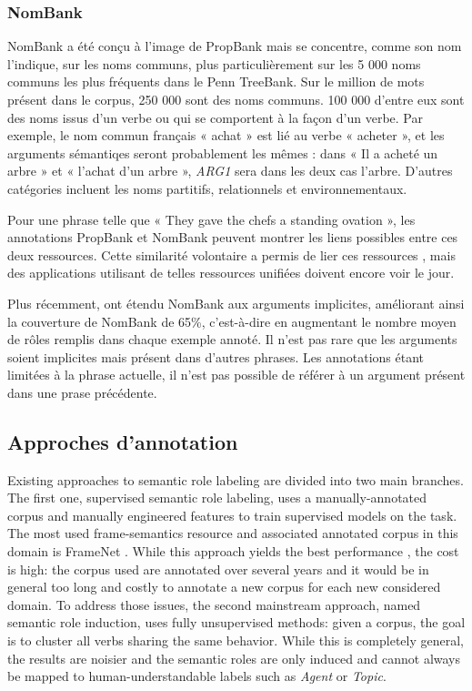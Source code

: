 \subsubsection{NomBank}

NomBank \citep{meyers2004nombank} a été conçu à l'image de PropBank mais se
concentre, comme son nom l'indique, sur les noms communs, plus particulièrement
sur les 5 000 noms communs les plus fréquents dans le Penn TreeBank. Sur le
million de mots présent dans le corpus, 250 000 sont des noms communs. 100 000
d'entre eux sont des noms issus d'un verbe ou qui se comportent à la façon d'un
verbe. Par exemple, le nom commun français « achat » est lié au verbe « acheter
», et les arguments sémantiqes seront probablement les mêmes : dans « Il a
acheté un arbre » et « l'achat d'un arbre », \textit{ARG1} sera dans les deux
cas l'arbre. D'autres catégories incluent les noms partitifs, relationnels et
environnementaux.

Pour une phrase telle que « They gave the chefs a standing ovation », les
annotations PropBank et NomBank peuvent montrer les liens possibles entre ces
deux ressources. Cette similarité volontaire a permis de lier ces ressources
\citep{pustejovsky2005merging,verhagen2007combining}, mais des applications
utilisant de telles ressources unifiées doivent encore voir le jour.

Plus récemment, \cite{gerber2010beyond} ont étendu NomBank aux arguments
implicites, améliorant ainsi la couverture de NomBank de 65\%, c'est-à-dire en
augmentant le nombre moyen de rôles remplis dans chaque exemple annoté. Il
n'est pas rare que les arguments soient implicites mais présent dans d'autres
phrases. Les annotations étant limitées à la phrase actuelle, il n'est pas
possible de référer à un argument présent dans une prase précédente.

\subsection{Approches d'annotation}

Existing approaches to semantic role labeling are divided into two main
branches. The first one, supervised semantic role labeling, uses a
manually-annotated corpus and manually engineered features to train supervised
models on the task. The most used frame-semantics resource and associated
annotated corpus in this domain is FrameNet \citep{baker1998berkeley}.
While this approach yields the best performance \citep{das2014frame}, the
cost is high: the corpus used are annotated over several years and it would be
in general too long and costly to annotate a new corpus for each new considered
domain. To address those issues, the second mainstream approach, named semantic
role induction, uses fully unsupervised methods: given a corpus, the goal is to
cluster all verbs sharing the same behavior. While this is completely general,
the results are noisier and the semantic roles are only induced and cannot
always be mapped to human-understandable labels such as \textit{Agent} or
\textit{Topic}.

